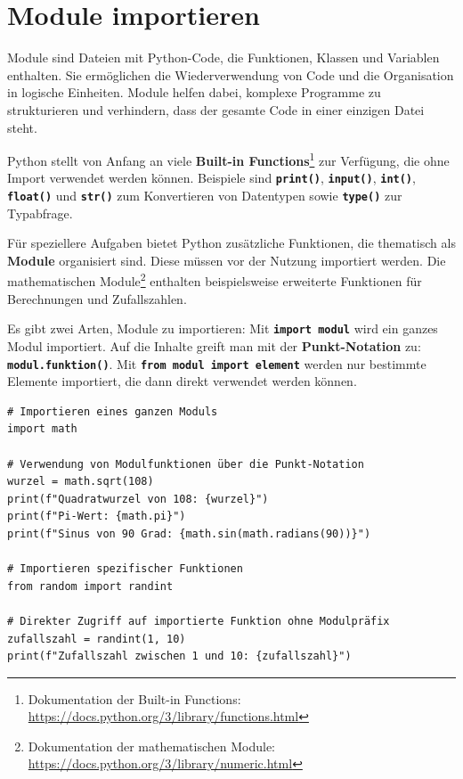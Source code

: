 \documentclass[ngerman,11pt]{article}
\begin{document}
\section{Module importieren}

Module sind Dateien mit Python-Code, die Funktionen, Klassen und Variablen enthalten. Sie ermöglichen die Wiederverwendung von Code und die Organisation in logische Einheiten. Module helfen dabei, komplexe Programme zu strukturieren und verhindern, dass der gesamte Code in einer einzigen Datei steht.

Python stellt von Anfang an viele \textbf{Built-in Functions}\footnote{Dokumentation der Built-in Functions: \url{https://docs.python.org/3/library/functions.html}} zur Verfügung, die ohne Import verwendet werden können. Beispiele sind \textbf{\texttt{print()}}, \textbf{\texttt{input()}}, \textbf{\texttt{int()}}, \textbf{\texttt{float()}} und \textbf{\texttt{str()}} zum Konvertieren von Datentypen sowie \textbf{\texttt{type()}} zur Typabfrage.

Für speziellere Aufgaben bietet Python zusätzliche Funktionen, die thematisch als \textbf{Module} organisiert sind. Diese müssen vor der Nutzung importiert werden. Die mathematischen Module\footnote{Dokumentation der mathematischen Module: \url{https://docs.python.org/3/library/numeric.html}} enthalten beispielsweise erweiterte Funktionen für Berechnungen und Zufallszahlen.

Es gibt zwei Arten, Module zu importieren: Mit \textbf{\texttt{import modul}} wird ein ganzes Modul importiert. Auf die Inhalte greift man mit der \textbf{Punkt-Notation} zu: \textbf{\texttt{modul.funktion()}}. Mit \textbf{\texttt{from modul import element}} werden nur bestimmte Elemente importiert, die dann direkt verwendet werden können.

\begin{lstlisting}[caption=module.py]
# Importieren eines ganzen Moduls
import math

# Verwendung von Modulfunktionen über die Punkt-Notation
wurzel = math.sqrt(108)
print(f"Quadratwurzel von 108: {wurzel}")
print(f"Pi-Wert: {math.pi}")
print(f"Sinus von 90 Grad: {math.sin(math.radians(90))}")

# Importieren spezifischer Funktionen
from random import randint

# Direkter Zugriff auf importierte Funktion ohne Modulpräfix
zufallszahl = randint(1, 10)
print(f"Zufallszahl zwischen 1 und 10: {zufallszahl}")
\end{lstlisting}
\end{document}
